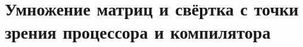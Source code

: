 \section{Умножение матриц и свёртка с точки зрения процессора и компилятора}
\label{sec:Chapter3} 

\newpage
